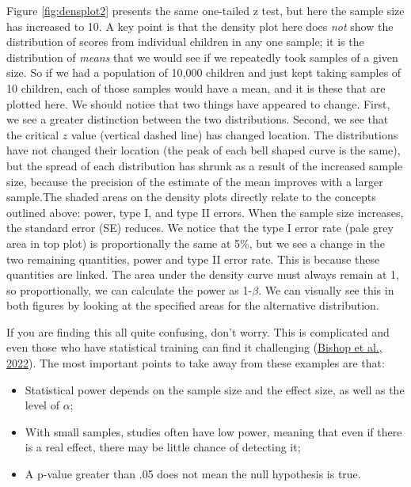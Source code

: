 \documentclass{krantz}
\providecommand{\tightlist}{%
\setlength{\itemsep}{0pt}\setlength{\parskip}{0pt}}
\begin{document}
Figure \ref{fig:densplot2} presents the same one-tailed z test, but here the sample size has increased to 10. A key point is that the density plot here does \emph{not} show the distribution of scores from individual children in any one sample; it is the distribution of \emph{means} that we would see if we repeatedly took samples of a given size. So if we had a population of 10,000 children and just kept taking samples of 10 children, each of those samples would have a mean, and it is these that are plotted here. We should notice that two things have appeared to change. First, we see a greater distinction between the two distributions. Second, we see that the critical \(z\) value (vertical dashed line) has changed location. The distributions have not changed their location (the peak of each bell shaped curve is the same), but the spread of each distribution has shrunk as a result of the increased sample size, because the precision of the estimate of the mean improves with a larger sample.The shaded areas on the density plots directly relate to the concepts outlined above: power, type I, and type II errors. When the sample size increases, the standard error (SE) reduces. We notice that the type I error rate (pale grey area in top plot) is proportionally the same at 5\%, but we see a change in the two remaining quantities, power and type II error rate. This is because these quantities are linked. The area under the density curve must always remain at 1, so proportionally, we can calculate the power as 1-\(\beta\). We can visually see this in both figures by looking at the specified areas for the alternative distribution.

If you are finding this all quite confusing, don't worry. This is complicated and even those who have statistical training can find it challenging (\protect\hyperlink{ref-bishop2022a}{Bishop et al., 2022}). The most important points to take away from these examples are that:\\
\begin{itemize}
\tightlist
\item
  Statistical power depends on the sample size and the effect size, as well as the level of \(\alpha\);
\item
  With small samples, studies often have low power, meaning that even if there is a real effect, there may be little chance of detecting it;
\item
  A p-value greater than .05 does not mean the null hypothesis is true.
\end{itemize}
\end{document}
